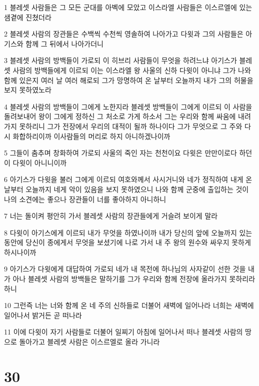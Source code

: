 \par 1 블레셋 사람들은 그 모든 군대를 아벡에 모았고 이스라엘 사람들은 이스르엘에 있는 샘곁에 진쳤더라
\par 2 블레셋 사람의 장관들은 수백씩 수천씩 영솔하여 나아가고 다윗과 그의 사람들은 아기스와 함께 그 뒤에서 나아가더니
\par 3 블레셋 사람의 방백들이 가로되 이 히브리 사람들이 무엇을 하려느냐 아기스가 블레셋 사람의 방백들에게 이르되 이는 이스라엘 왕 사울의 신하 다윗이 아니냐 그가 나와 함께 있은지 여러 날 여러 해로되 그가 망명하여 온 날부터 오늘까지 내가 그의 허물을 보지 못하였노라
\par 4 블레셋 사람의 방백들이 그에게 노한지라 블레셋 방백들이 그에게 이르되 이 사람을 돌려보내어 왕이 그에게 정하신 그 처소로 가게 하소서 그는 우리와 함께 싸움에 내려가지 못하리니 그가 전장에서 우리의 대적이 될까 하나이다 그가 무엇으로 그 주와 다시 화합하리이까 이사람들의 머리로 하지 아니하겠나이까
\par 5 그들이 춤추며 창화하여 가로되 사울의 죽인 자는 천천이요 다윗은 만만이로다 하던 이 다윗이 아니니이까
\par 6 아기스가 다윗을 불러 그에게 이르되 여호와께서 사시거니와 네가 정직하여 내게 온 날부터 오늘까지 네게 악이 있음을 보지 못하였으니 나와 함께 군중에 출입하는 것이 나의 소견에는 좋으나 장관들이 너를 좋아하지 아니하니
\par 7 너는 돌이켜 평안히 가서 블레셋 사람의 장관들에게 거슬려 보이게 말라
\par 8 다윗이 아기스에게 이르되 내가 무엇을 하였나이까 내가 당신의 앞에 오늘까지 있는 동안에 당신이 종에게서 무엇을 보셨기에 나로 가서 내 주 왕의 원수와 싸우지 못하게 하시나이까
\par 9 아기스가 다윗에게 대답하여 가로되 네가 내 목전에 하나님의 사자같이 선한 것을 내가 아나 블레셋 사람의 방백들은 말하기를 그가 우리와 함께 전장에 올라가지 못하리라 하니
\par 10 그런즉 너는 너와 함께 온 네 주의 신하들로 더불어 새벽에 일어나라 너희는 새벽에 일어나서 밝거든 곧 떠나라
\par 11 이에 다윗이 자기 사람들로 더불어 일찌기 아침에 일어나서 떠나 블레셋 사람의 땅으로 돌아가고 블레셋 사람은 이스르엘로 올라 가니라

\chapter{30}

